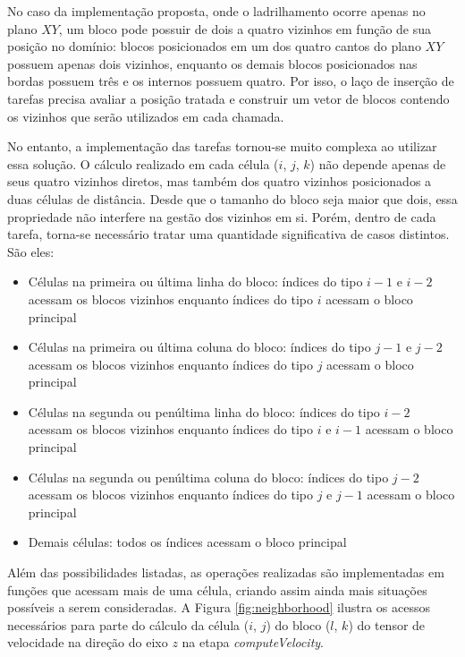 \documentclass[cic,tc]{iiufrgs}
\begin{document}
No caso da implementação proposta, onde o ladrilhamento ocorre apenas no plano $XY$, um bloco pode possuir de dois a quatro vizinhos
em função de sua posição no domínio: blocos posicionados em um dos quatro cantos do plano $XY$ possuem apenas dois vizinhos, enquanto
os demais blocos posicionados nas bordas possuem três e os internos possuem quatro. Por isso, o laço de inserção de tarefas precisa
avaliar a posição tratada e construir um vetor de blocos contendo os vizinhos que serão utilizados em cada chamada.

No entanto, a implementação das tarefas tornou-se muito complexa ao utilizar essa solução. O cálculo realizado em cada célula ($i$, $j$, $k$) não depende apenas de seus quatro vizinhos diretos, mas também dos quatro vizinhos posicionados a duas células de distância. Desde que o tamanho do bloco seja maior que dois, essa propriedade não interfere na gestão dos vizinhos em si. Porém, dentro de cada tarefa, torna-se
necessário tratar uma quantidade significativa de casos distintos. São eles:

\begin{itemize}
\item{Células na primeira ou última linha do bloco:} índices do tipo $i - 1$ e $i - 2$ acessam os blocos vizinhos enquanto índices do tipo $i$ acessam o bloco principal 
\item{Células na primeira ou última coluna do bloco:} índices do tipo $j - 1$ e $j - 2$ acessam os blocos vizinhos enquanto índices do tipo $j$ acessam o bloco principal
\item{Células na segunda ou penúltima linha do bloco:} índices do tipo $i - 2$ acessam os blocos vizinhos enquanto índices do tipo $i$ e $i - 1$ acessam o bloco principal
\item{Células na segunda ou penúltima coluna do bloco:} índices do tipo $j - 2$ acessam os blocos vizinhos enquanto índices do tipo $j$ e $j - 1$ acessam o bloco principal
\item{Demais células:} todos os índices acessam o bloco principal
\end{itemize}

Além das possibilidades listadas, as operações realizadas são implementadas em funções que acessam mais de uma célula, criando assim
ainda mais situações possíveis a serem consideradas. A Figura \ref{fig:neighborhood} ilustra os acessos necessários para parte do cálculo
da célula ($i$, $j$) do bloco ($l$, $k$) do tensor de velocidade na direção do eixo $z$ na etapa \textit{computeVelocity}.
\end{document}
